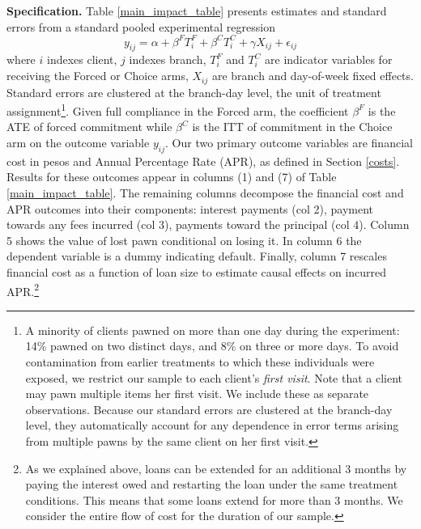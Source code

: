 \documentclass[11pt, a4paper]{article}
\begin{document}
\vspace{.2in}
\noindent \textbf{Specification.} Table \ref{main_impact_table} presents estimates and standard errors from a standard pooled experimental regression 
\begin{equation} \label{basic_reg}
    y_{ij} = \alpha + \beta^F T_{i}^F + \beta^C T_{i}^C + \gamma X_{ij} + \epsilon_{ij}
\end{equation}
where $i$ indexes client, $j$ indexes branch, $T_{i}^F$ and $T_{i}^C$ are indicator variables for receiving the Forced or Choice arms, $X_{ij}$ are branch and day-of-week fixed effects. Standard errors are clustered at the branch-day level, the unit of treatment assignment\footnote{A minority of clients pawned on more than one day during the experiment: 14\% pawned on two distinct days, and 8\% on three or more days. To avoid contamination from earlier treatments to which these individuals were exposed, we restrict our sample to each client's \emph{first visit}. Note that a client may pawn multiple items her first visit. We include these as separate observations. Because our standard errors are clustered at the branch-day level, they automatically account for any dependence in error terms arising from multiple pawns by the same client on her first visit.}.
Given full compliance in the Forced arm, the coefficient $\beta^F$ is the ATE of forced commitment while $\beta^C$ is the ITT of commitment in the Choice arm on the outcome variable $y_{ij}$.
Our two primary outcome variables are financial cost in pesos and Annual Percentage Rate (APR), as defined in Section \ref{costs}. 
Results for these outcomes appear in columns (1) and (7) of Table \ref{main_impact_table}.
The remaining columns decompose the financial cost and APR outcomes into their components: interest payments (col 2), payment towards any fees incurred (col 3), payments toward the principal (col 4). Column 5 shows the value of lost pawn conditional on losing it.  In column 6 the dependent variable is a dummy indicating default.  Finally, column 7 rescales financial cost as a function of loan size to estimate causal effects on incurred APR.\footnote{As we explained above, loans can be extended for an additional 3 months by paying the interest owed and restarting the loan under the same treatment conditions. This means that some loans extend for more than 3 months. We consider the entire flow of cost for the duration of our sample.}  
\end{document}
